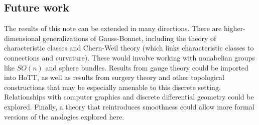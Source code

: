 \subsection{Future work}
The results of this note can be extended in many directions. There are higher-dimensional generalizations of Gauss-Bonnet, including the theory of characteristic classes and Chern-Weil theory (which links characteristic classes to connections and curvature). These would involve working with nonabelian groups like \( SO(n) \) and sphere bundles. Results from gauge theory could be imported into HoTT, as well as results from surgery theory and other topological constructions that may be especially amenable to this discrete setting. Relationships with computer graphics and discrete differential geometry\cite{crane_ddg}\cite{crane_connections} could be explored. Finally, a theory that reintroduces smoothness could allow more formal versions of the analogies explored here. 

